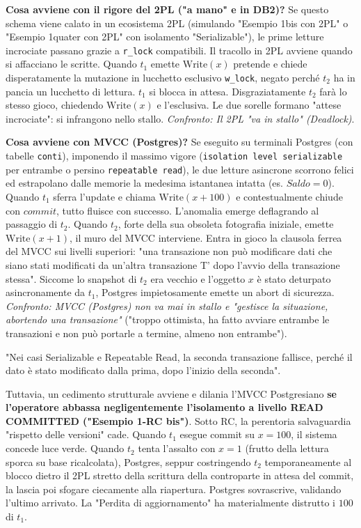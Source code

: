 \textbf{Cosa avviene con il rigore del 2PL ("a mano" e in DB2)?}
Se questo schema viene calato in un ecosistema 2PL (simulando "Esempio 1bis con 2PL" o "Esempio 1quater con 2PL" con isolamento "Serializable"), le prime letture incrociate passano grazie a \texttt{r\_lock} compatibili. Il tracollo in 2PL avviene quando si affacciano le scritte. Quando $t_1$ emette $\text{Write}(x)$ pretende e chiede disperatamente la mutazione in lucchetto esclusivo \texttt{w\_lock}, negato perché $t_2$ ha in pancia un lucchetto di lettura. $t_1$ si blocca in attesa. Disgraziatamente $t_2$ farà lo stesso gioco, chiedendo $\text{Write}(x)$ e l'esclusiva. Le due sorelle formano "attese incrociate": si infrangono nello stallo.
\textit{Confronto: Il 2PL "va in stallo" (Deadlock)}.

\textbf{Cosa avviene con MVCC (Postgres)?}
Se eseguito su terminali Postgres (con tabelle \texttt{conti}), imponendo il massimo vigore (\texttt{isolation level serializable} per entrambe o persino \texttt{repeatable read}), le due letture asincrone scorrono felici ed estrapolano dalle memorie la medesima istantanea intatta (es. $Saldo=0$).
Quando $t_1$ sferra l'update e chiama $\text{Write}(x+100)$ e contestualmente chiude con $commit$, tutto fluisce con successo.
L'anomalia emerge deflagrando al passaggio di $t_2$. Quando $t_2$, forte della sua obsoleta fotografia iniziale, emette $\text{Write}(x+1)$, il muro del MVCC interviene. Entra in gioco la clausola ferrea del MVCC sui livelli superiori: "una transazione non può modificare dati che siano stati modificati da un'altra transazione T' dopo l'avvio della transazione stessa". Siccome lo snapshot di $t_2$ era vecchio e l'oggetto $x$ è stato deturpato asincronamente da $t_1$, Postgres impietosamente emette un abort di sicurezza.
\textit{Confronto: MVCC (Postgres) non va mai in stallo e "gestisce la situazione, abortendo una transazione"} ("troppo ottimista, ha fatto avviare entrambe le transazioni e non può portarle a termine, almeno non entrambe").

"Nei casi Serializable e Repeatable Read, la seconda transazione fallisce, perché il dato è stato modificato dalla prima, dopo l'inizio della seconda".

Tuttavia, un cedimento strutturale avviene e dilania l'MVCC Postgresiano \textbf{se l'operatore abbassa negligentemente l'isolamento a livello READ COMMITTED ("Esempio 1-RC bis")}. Sotto RC, la perentoria salvaguardia "rispetto delle versioni" cade. Quando $t_1$ esegue commit su $x=100$, il sistema concede luce verde. Quando $t_2$ tenta l'assalto con $x=1$ (frutto della lettura sporca su base ricalcolata), Postgres, seppur costringendo $t_2$ temporaneamente al blocco dietro il 2PL stretto della scrittura della controparte in attesa del commit, la lascia poi sfogare ciecamente alla riapertura. Postgres sovrascrive, validando l'ultimo arrivato. La "Perdita di aggiornamento" ha materialmente distrutto i $100$ di $t_1$.

